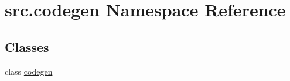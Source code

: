 \hypertarget{namespacesrc_1_1codegen}{\section{src.\-codegen Namespace Reference}
\label{namespacesrc_1_1codegen}
}
\subsection*{Classes}
\begin{DoxyCompactItemize}
\item 
class \hyperlink{classsrc_1_1codegen_1_1codegen}{codegen}
\end{DoxyCompactItemize}
